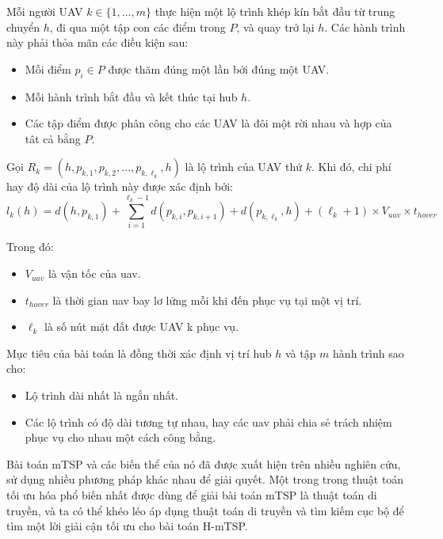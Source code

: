 \documentclass[a4paper]{article}
\begin{document}
Mỗi người UAV \( k \in \{1, \dots, m\} \) thực hiện một lộ trình khép kín bắt đầu từ trung chuyển \( h \), đi qua một tập con các điểm trong \( P \), và quay trở lại \( h \). Các hành trình này phải thỏa mãn các điều kiện sau:

\begin{itemize}
    \item Mỗi điểm \( p_i \in P \) được thăm đúng một lần bởi đúng một UAV.
    \item Mỗi hành trình bắt đầu và kết thúc tại hub \( h \).
    \item Các tập điểm được phân công cho các UAV là đôi một rời nhau và hợp của tât cả bằng \( P \).
\end{itemize}

Gọi \( R_k = (h, p_{k,1}, p_{k,2}, \dots, p_{k,\ell_k}, h) \) là lộ trình của UAV thứ \( k \). Khi đó, chi phí hay độ dài của lộ trình này được xác định bởi:
\begin{equation}
l_k(h) = d(h, p_{k,1}) + \sum_{i=1}^{\ell_k - 1} d(p_{k,i}, p_{k,i+1}) + d(p_{k,\ell_k}, h) + (\ell_k + 1) \times V_{uav} \times t_{hover}
\label{eq:route_length}
\end{equation}

Trong đó:
\begin{itemize}
  \item $V_{uav}$ là vận tốc của uav.
  \item $t_{hover}$ là thời gian uav bay lơ lửng mỗi khi đến phục vụ tại một vị trí.
  \item $\ell_k$ là số nút mặt đất được UAV k phục vụ.
\end{itemize}

Mục tiêu của bài toán là đồng thời xác định vị trí hub \( h \) và tập \( m \) hành trình sao cho:
\begin{itemize}
  \item Lộ trình dài nhất là ngắn nhất.
  \item Các lộ trình có độ dài tương tự nhau, hay các uav phải chia sẻ trách nhiệm phục vụ cho nhau một cách công bằng.
\end{itemize}

Bài toán mTSP và các biến thể của nó đã được xuất hiện trên nhiều nghiên cứu, sử dụng nhiều phương pháp khác nhau để giải quyết. Một trong trong thuật toán tối ưu hóa phổ biến nhất được dùng để giải bài toán mTSP là thuật toán di truyền, và ta có thể khéo léo áp dụng thuật toán di truyền và tìm kiếm cục bộ để tìm một lời giải cận tối ưu cho bài toán H-mTSP.
\end{document}
